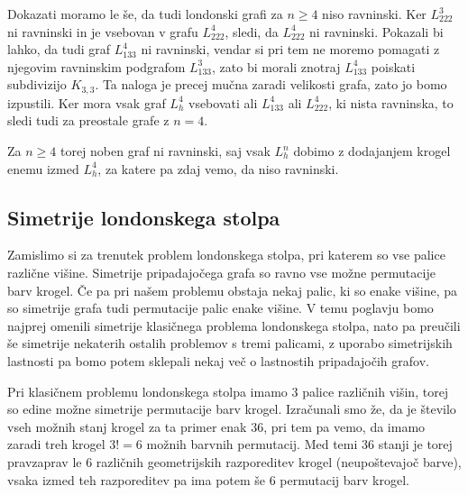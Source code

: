 \documentclass[12pt,a4paper]{amsart}
\theoremstyle{definition} %
\newtheorem{opomba}[definicija]{Opomba}
\theoremstyle{plain} %
\begin{document}
    Dokazati moramo le še, da tudi londonski grafi za $n\geq 4$ niso ravninski.
    Ker $L_{222}^3$ ni ravninski in je vsebovan v grafu $L_{222}^4$, sledi, da $L_{222}^4$ ni ravninski. Pokazali bi lahko, da tudi graf $L_{133}^4$ ni ravninski, vendar si pri tem ne moremo pomagati z njegovim ravninskim podgrafom $L_{133}^3$, zato bi morali znotraj $L_{133}^4$ poiskati subdivizijo $K_{3,3}$. Ta naloga je precej mučna zaradi velikosti grafa, zato jo bomo izpustili.
    Ker mora vsak graf $L_h^4$ vsebovati ali $L_{133}^4$ ali $L_{222}^4$, ki nista ravninska, to sledi tudi za preostale grafe z $n=4$.
    
    Za $n \geq 4$ torej noben graf ni ravninski, saj vsak $L_h^n$ dobimo z dodajanjem krogel enemu izmed $L_h^4$, za katere pa zdaj vemo, da niso ravninski.
\endproof


\subsection{Simetrije londonskega stolpa}

Zamislimo si za trenutek problem londonskega stolpa, pri katerem so vse palice različne višine. Simetrije pripadajočega grafa so ravno vse možne permutacije barv krogel.
Če pa pri našem problemu obstaja nekaj palic, ki so enake višine, pa so simetrije grafa tudi permutacije palic enake višine.
V temu poglavju bomo najprej omenili simetrije klasičnega problema londonskega stolpa, nato pa preučili še simetrije nekaterih ostalih problemov s tremi palicami, z uporabo simetrijskih lastnosti pa bomo potem sklepali nekaj več o lastnostih pripadajočih grafov.

Pri klasičnem problemu londonskega stolpa imamo $3$ palice različnih višin, torej so edine možne simetrije permutacije barv krogel. 
Izračunali smo že, da je število vseh možnih stanj krogel za ta primer enak $36$, pri tem pa vemo, da imamo zaradi treh krogel $3! = 6$ možnih barvnih permutacij. Med temi $36$ stanji je torej pravzaprav le $6$ različnih geometrijskih razporeditev krogel (neupoštevajoč barve), vsaka izmed teh razporeditev pa ima potem še $6$ permutacij barv krogel.
\end{document}
